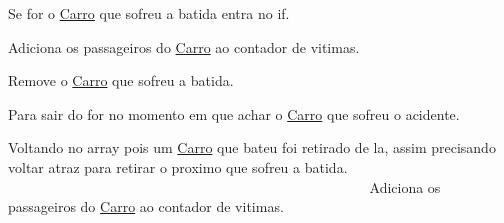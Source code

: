 Se for o \mbox{\hyperlink{class_carro}{Carro}} que sofreu a batida entra no if.

Adiciona os passageiros do \mbox{\hyperlink{class_carro}{Carro}} ao contador de vitimas.

Remove o \mbox{\hyperlink{class_carro}{Carro}} que sofreu a batida.

Para sair do for no momento em que achar o \mbox{\hyperlink{class_carro}{Carro}} que sofreu o acidente.

Voltando no array pois um \mbox{\hyperlink{class_carro}{Carro}} que bateu foi retirado de la, assim precisando voltar atraz para retirar o proximo que sofreu a batida. ~\newline
~\newline
~\newline
~\newline
~\newline
~\newline
~\newline
~\newline
~\newline
~\newline
~\newline
~\newline
~\newline
~\newline
~\newline
~\newline
~\newline
~\newline
~\newline
~\newline
~\newline
~\newline
~\newline
~\newline
~\newline
~\newline
~\newline
~\newline
~\newline
~\newline
~\newline
~\newline
~\newline
~\newline
~\newline
~\newline
~\newline
~\newline
~\newline
~\newline
~\newline
~\newline
~\newline
~\newline
~\newline
 Adiciona os passageiros do \mbox{\hyperlink{class_carro}{Carro}} ao contador de vitimas.

